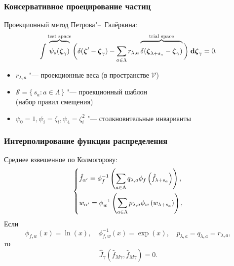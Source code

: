 \documentclass[mathserif]{beamer} %
\newcommand{\dd}{\:\mathrm{d}}
\newcommand{\dzeta}{\boldsymbol{\dd\zeta}}
\newcommand{\bzeta}{\boldsymbol{\zeta}}
\newcommand{\Set}[2]{\{\,{#1}:{#2}\,\}}
\newcommand{\xoverbrace}[2][\vphantom{\int}]{\overbrace{#1#2}}
\begin{document}
\begin{frame}
    \frametitle{Консервативное проецирование частиц}
    Проекционный метод Петрова"--~Галёркина:
    \begin{equation}\label{eq:Petrov-Galerkin}
        \int \xoverbrace{ \psi_s(\bzeta_\gamma) }^\text{test space} \bigg(
            \delta(\bzeta'-\bzeta_\gamma) - \sum_{a\in\Lambda} r_{\lambda,a}
            \xoverbrace{ \delta(\bzeta_{\lambda+s_a}-\bzeta_\gamma) }^\text{trial space}
        \bigg) \dzeta_\gamma = 0.
    \end{equation}
    \begin{itemize}
        \item \(r_{\lambda,a}\) "--- проекционные веса (в пространстве \(\mathcal{V}\))
        \item \(\mathcal{S} = \Set{s_a}{a\in\Lambda}\) "--- проекционный шаблон \\(набор правил смещения)
        \item \(\psi_0 = 1, \psi_i = \zeta_i, \psi_4 = \zeta_i^2\) "--- столкновительные инварианты
    \end{itemize}
\end{frame}

\begin{frame}
    \frametitle{Интерполирование функции распределения}
    Среднее взвешенное по Колмогорову:
    \begin{equation}\label{eq:Kolmogorov_mean}
        \begin{dcases}
            \hat{f}_{\alpha'} = \phi^{-1}_f\left(\sum_{a\in\Lambda} q_{\lambda,a}
                \phi_f\left(\hat{f}_{\lambda+s_a}\right)\right), \\
            w_{\alpha'} = \phi^{-1}_w\left(\sum_{a\in\Lambda} p_{\lambda,a}
                \phi_w\left(w_{\lambda+s_a}\right)\right), \\
        \end{dcases}
    \end{equation}
    Если
    \begin{equation}\label{eq:geometric_mean}
       \phi_{f,w}(x) = \ln(x), \quad \phi_{f,w}^{-1}(x) = \exp(x), \quad p_{\lambda,a} = q_{\lambda,a} = r_{\lambda,a},
    \end{equation}
    то
    \begin{equation}\label{eq:strict_interpolation}
        \hat{J}_\gamma(\hat{f}_{M\gamma}, \hat{f}_{M\gamma}) = 0.
    \end{equation}
\end{frame}
\end{document}
